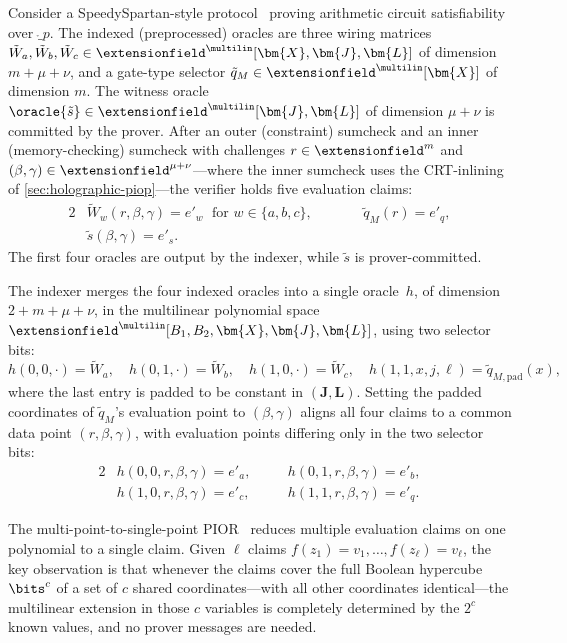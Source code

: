 \label{sec:speedyspartan}
Consider a SpeedySpartan-style protocol~\cite{EPRINT:SetTha25} proving arithmetic circuit satisfiability over $\ring_p$. The indexed (preprocessed) oracles are three wiring matrices $\tilde{W}_a, \tilde{W}_b, \tilde{W}_c \in \extensionfield^{\multilin}[\bm{X}, \bm{J}, \bm{L}]$ of dimension $m + \mu + \nu$, and a gate-type selector $\tilde{q}_M \in \extensionfield^{\multilin}[\bm{X}]$ of dimension $m$. The witness oracle $\oracle{\tilde{s}} \in \extensionfield^{\multilin}[\bm{J}, \bm{L}]$ of dimension $\mu + \nu$ is committed by the prover. After an outer (constraint) sumcheck and an inner (memory-checking) sumcheck with challenges $r \in \extensionfield^m$ and $(\beta, \gamma) \in \extensionfield^{\mu + \nu}$---where the inner sumcheck uses the CRT-inlining of \cref{sec:holographic-piop}---the verifier holds five evaluation claims:
\begin{alignat*}{2}
    &\tilde{W}_w(r, \beta, \gamma) = e'_w \;\text{ for } w \in \{a,b,c\}, \qquad &&\tilde{q}_M(r) = e'_q, \\
    &\tilde{s}(\beta, \gamma) = e'_s. &&
\end{alignat*}
The first four oracles are output by the indexer, while $\tilde{s}$ is prover-committed.

The indexer merges the four indexed oracles into a single oracle~$h$, of dimension $2 + m + \mu + \nu$, in the multilinear polynomial space $\extensionfield^{\multilin}[B_1, B_2, \bm{X}, \bm{J}, \bm{L}]$, using two selector bits:
\[
h(0,0,\cdot) = \tilde{W}_a,\quad h(0,1,\cdot) = \tilde{W}_b,\quad h(1,0,\cdot) = \tilde{W}_c,\quad h(1,1,x,j,\ell) = \tilde{q}_{M,\mathrm{pad}}(x),
\]
where the last entry is padded to be constant in $(\bm{J}, \bm{L})$. Setting the padded coordinates of $\tilde{q}_M$'s evaluation point to $(\beta, \gamma)$ aligns all four claims to a common data point $(r, \beta, \gamma)$, with evaluation points differing only in the two selector bits:
\begin{alignat*}{2}
    &h(0, 0, r, \beta, \gamma) = e'_a, \quad &&h(0, 1, r, \beta, \gamma) = e'_b, \\
    &h(1, 0, r, \beta, \gamma) = e'_c, \quad &&h(1, 1, r, \beta, \gamma) = e'_q.
\end{alignat*}

The multi-point-to-single-point PIOR~\cite{BCHO22} reduces multiple evaluation claims on one polynomial to a single claim. Given $\ell$ claims $f(z_1) = v_1, \ldots, f(z_\ell) = v_\ell$, the key observation is that whenever the claims cover the full Boolean hypercube $\bits^c$ of a set of $c$ shared coordinates---with all other coordinates identical---the multilinear extension in those $c$ variables is completely determined by the $2^c$ known values, and no prover messages are needed. 


